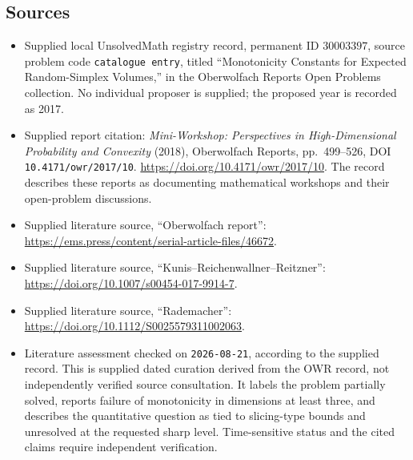 \documentclass[11pt]{article}
\begin{document}
\subsection{Sources}
\begin{itemize}
\item Supplied local UnsolvedMath registry record, permanent ID \(30003397\), source problem code \texttt{catalogue entry}, titled ``Monotonicity Constants for Expected Random-Simplex Volumes,'' in the Oberwolfach Reports Open Problems collection. No individual proposer is supplied; the proposed year is recorded as 2017.
\item Supplied report citation: \emph{Mini-Workshop: Perspectives in High-Dimensional Probability and Convexity} (2018), Oberwolfach Reports, pp.~499--526, DOI \texttt{10.4171/owr/2017/10}. \url{https://doi.org/10.4171/owr/2017/10}. The record describes these reports as documenting mathematical workshops and their open-problem discussions.
\item Supplied literature source, ``Oberwolfach report'': \url{https://ems.press/content/serial-article-files/46672}.
\item Supplied literature source, ``Kunis--Reichenwallner--Reitzner'': \url{https://doi.org/10.1007/s00454-017-9914-7}.
\item Supplied literature source, ``Rademacher'': \url{https://doi.org/10.1112/S0025579311002063}.
\item Literature assessment checked on \texttt{2026-08-21}, according to the supplied record. This is supplied dated curation derived from the OWR record, not independently verified source consultation. It labels the problem partially solved, reports failure of monotonicity in dimensions at least three, and describes the quantitative question as tied to slicing-type bounds and unresolved at the requested sharp level. Time-sensitive status and the cited claims require independent verification.
\end{itemize}
\end{document}
